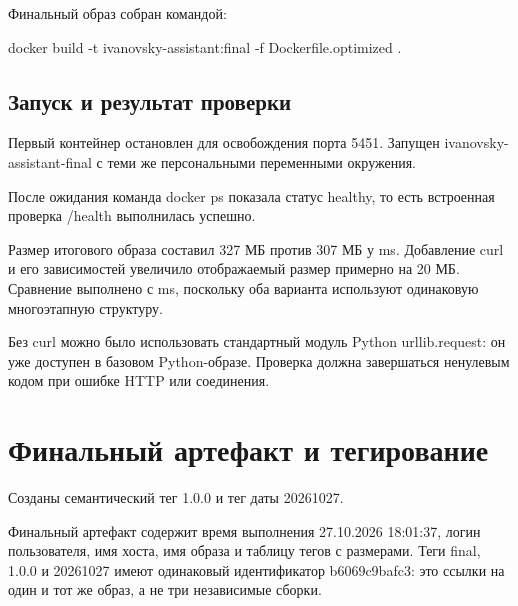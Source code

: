 Финальный образ собран командой:
\begin{code}
docker build -t ivanovsky-assistant:final -f Dockerfile.optimized .
\end{code}

\section{Запуск и результат проверки}
Первый контейнер остановлен для освобождения порта 5451. Запущен ivanovsky-assistant-final с теми же персональными переменными окружения.

После ожидания команда docker ps показала статус healthy, то есть встроенная проверка /health выполнилась успешно.

Размер итогового образа составил 327 МБ против 307 МБ у ms. Добавление curl и его зависимостей увеличило отображаемый размер примерно на 20 МБ. Сравнение выполнено с ms, поскольку оба варианта используют одинаковую многоэтапную структуру.

Без curl можно было использовать стандартный модуль Python urllib.request: он уже доступен в базовом Python-образе. Проверка должна завершаться ненулевым кодом при ошибке HTTP или соединения.

\chapter{Финальный артефакт и тегирование}
Созданы семантический тег 1.0.0 и тег даты 20261027.

Финальный артефакт содержит время выполнения 27.10.2026 18:01:37, логин пользователя, имя хоста, имя образа и таблицу тегов с размерами. Теги final, 1.0.0 и 20261027 имеют одинаковый идентификатор b6069c9bafc3: это ссылки на один и тот же образ, а не три независимые сборки.

